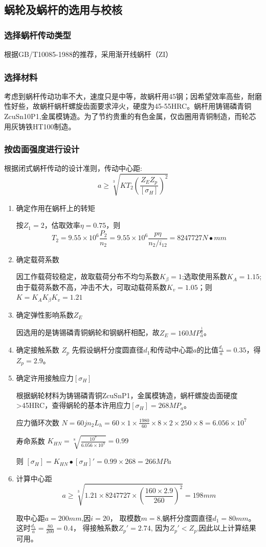 \documentclass[a4paper,12pt]{article}
\begin{document}
\subsection{蜗轮及蜗杆的选用与校核}
\subsubsection{选择蜗杆传动类型}
根据GB/T10085-1988的推荐，采用渐开线蜗杆（ZI）
\subsubsection{选择材料}
考虑到蜗杆传动功率不大，速度只是中等，故蜗杆用45钢；因希望效率高些，耐磨性好些，故蜗杆蜗杆螺旋齿面要求淬火，硬度为45-55HRC。蜗杆用铸锡磷青铜ZcuSn10P1,金属模铸造。为了节约贵重的有色金属，仅齿圈用青铜制造，而轮芯用灰铸铁HT100制造。
\subsubsection{按齿面强度进行设计}
根据闭式蜗杆传动的设计准则，传动中心距:
$$a\geq \sqrt[3]{KT_2\left( \frac{Z_EZ_p}{[\sigma _H]} \right)^2 }$$
\begin{enumerate}
	\item 确定作用在蜗杆上的转矩
	
	按$Z_1=2$，估取效率$ \eta =0.75$，则
	$$ T_2=9.55\times 10^6 \frac{P_2}{n_2} =9.55\times 10^6 \frac{p\eta }{n_2/i_{12}}=8247727 N\bullet mm$$
	\item 确定载荷系数
	
	因工作载荷较稳定，故取载荷分布不均匀系数$K_\beta=1$;选取使用系数$K_A=1.15$;由于载荷系数不高，冲击不大，可取动载荷系数$K_v=1.05$；则
$K=K_A K_\beta K_v=1.21$
	
	\item 确定弹性影响系数$Z_E$
	
	因选用的是铸锡磷青铜蜗轮和钢蜗杆相配，故$Z_E=160MP_a^\frac{1}{2}$。

\item 确定接触系数 $Z_p$
先假设蜗杆分度圆直径$d_1$和传动中心距$a$的比值$\frac{d_1}{a}=0.35$，得$Z_p=2.9$。

	\item 确定许用接触应力$[\sigma_H]$
	
	根据蜗轮材料为铸锡磷青铜ZcuSnP1，金属模铸造，蜗杆螺旋齿面硬度>45HRC，查得蜗轮的基本许用应力$[\sigma_H]=268MP_a$。
	
 	  应力循环次数    $N=60jn_2L_h=60\times 1 \times \frac{1980}{60}\times 8 \times 2 \times 250 \times 8 = 6.056\times 10^7$
 	  
 	  寿命系数 $K_{HN}=\sqrt[8]{\frac{10^7}{6.056\times 10^7}}=0.99$
	
	则 $[\sigma_H]=K_{HN}\bullet [\sigma_H]'=0.99\times 268 =266MPa$
	
	\item  计算中心距  $$a \geq \sqrt[3] {1.21\times 8247727 \times \left(\frac{160\times 2.9}{260} \right) ^2}=198mm$$
	
	取中心距$a=200mm$,因$i=20$，
	取模数$m=8$,蜗杆分度圆直径$d_1=80mm$。
	这时$\frac{d_1}{a}=\frac{80}{200}=0.4$，
   得接触系数$Z_p'=2.74$,
	因为$Z_p'<Z_p$,因此以上计算结果可用。
\end{enumerate}
\end{document}
